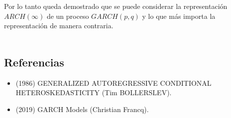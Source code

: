 Por lo tanto queda demostrado que se puede considerar la representación $ARCH(\infty)$ de un proceso $GARCH(p,q)$ y lo que más importa la representación de manera contraria.\\\\

\subsection*{Referencias}
\begin{itemize}
    \item (1986) GENERALIZED AUTOREGRESSIVE CONDITIONAL HETEROSKEDASTICITY (Tim BOLLERSLEV).
    \item (2019) GARCH Models (Christian Francq).
\end{itemize}
